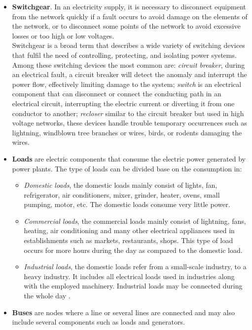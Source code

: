 \begin{itemize}
    \item \textbf{Switchgear}. In an electricity supply, it is necessary to disconnect equipment from the network quickly if a fault occurs to avoid damage on the elements of the network, or to disconnect some points of the network to avoid excessive losses or too high or low voltages. \\
    Switchgear is a broad term that describes a wide variety of switching devices that fulfil the need of controlling, protecting, and isolating power systems. Among these switching devices the most common are: \emph{circuit breaker}, during an electrical fault, a circuit breaker will detect the anomaly and interrupt the power flow, effectively limiting damage to the system; \emph{switch} is an electrical component that can disconnect or connect the conducting path in an electrical circuit, interrupting the electric current or diverting it from one conductor to another; \emph{recloser} similar to the circuit breaker but used in high voltage networks, these devices handle trouble temporary occurrences such as lightning, windblown tree branches or wires,
    birds, or rodents damaging the wires.
    
    \item \textbf{Loads} are electric components that consume the electric power generated by power plants. The type of loads can be divided base on the consumption in:
    \begin{itemize}
        \item[] \emph{Domestic loads}, the domestic loads mainly consist of lights, fan, refrigerator, air conditioners, mixer, grinder, heater, ovens, small pumping, motor, etc. The domestic loads consume very little power.
        \item[] \emph{Commercial loads}, the commercial loads mainly consist of lightning, fans, heating, air conditioning and many other electrical appliances used in establishments such as markets, restaurants, shops. This type of load occurs for more hours during the day as compared to the domestic load.
        \item[] \emph{Industrial loads}, the domestic loads refer from a small-scale industry, to a heavy industry. It includes all electrical loads used in industries along with the employed machinery. Industrial loads may be connected during the whole day \cite{EDNdesign}.
    \end{itemize}
    
    \item \textbf{Buses} are nodes where a line or several lines are connected and may also include several components such as loads and generators.
\end{itemize}

